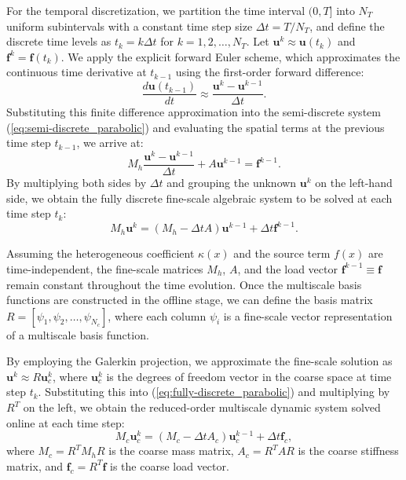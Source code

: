 For the temporal discretization, we partition the time interval $(0,T]$ into $N_T$ uniform subintervals with a constant time step size $\Delta t = T/N_T$, and define the discrete time levels as $t_k = k\Delta t$ for $k=1, 2, \dots, N_T$. Let $\mathbf{u}^k \approx \mathbf{u}(t_k)$ and $\mathbf{f}^k = \mathbf{f}(t_k)$. We apply the explicit forward Euler scheme, which approximates the continuous time derivative at $t_{k-1}$ using the first-order forward difference:
\begin{equation*}
\frac{d\mathbf{u}(t_{k-1})}{dt} \approx \frac{\mathbf{u}^k - \mathbf{u}^{k-1}}{\Delta t}.
\end{equation*}
Substituting this finite difference approximation into the semi-discrete system (\ref{eq:semi-discrete_parabolic}) and evaluating the spatial terms at the previous time step $t_{k-1}$, we arrive at:
\begin{equation*}
M_h \frac{\mathbf{u}^k - \mathbf{u}^{k-1}}{\Delta t} + A \mathbf{u}^{k-1} = \mathbf{f}^{k-1}.
\end{equation*}
By multiplying both sides by $\Delta t$ and grouping the unknown $\mathbf{u}^k$ on the left-hand side, we obtain the fully discrete fine-scale algebraic system to be solved at each time step $t_k$:
\begin{equation}
\label{eq:fully-discrete_parabolic}
M_h \mathbf{u}^k = \left( M_h - \Delta t A \right) \mathbf{u}^{k-1} + \Delta t \mathbf{f}^{k-1}.
\end{equation}

Assuming the heterogeneous coefficient $\kappa(x)$ and the source term $f(x)$ are time-independent, the fine-scale matrices $M_h$, $A$, and the load vector $\mathbf{f}^{k-1} \equiv \mathbf{f}$ remain constant throughout the time evolution. Once the multiscale basis functions are constructed in the offline stage, we can define the basis matrix $R = [\psi_1, \psi_2, \dots, \psi_{N_c}]$, where each column $\psi_i$ is a fine-scale vector representation of a multiscale basis function. 

By employing the Galerkin projection, we approximate the fine-scale solution as $\mathbf{u}^k \approx R \mathbf{u}_c^k$, where $\mathbf{u}_c^k$ is the degrees of freedom vector in the coarse space at time step $t_k$. Substituting this into (\ref{eq:fully-discrete_parabolic}) and multiplying by $R^T$ on the left, we obtain the reduced-order multiscale dynamic system solved online at each time step:
\begin{equation}
\label{eq:cem-discrete_parabolic}
M_c \mathbf{u}_c^k = \left( M_c - \Delta t A_c \right) \mathbf{u}_c^{k-1} + \Delta t \mathbf{f}_c,
\end{equation}
where $M_c = R^T M_h R$ is the coarse mass matrix, $A_c = R^T A R$ is the coarse stiffness matrix, and $\mathbf{f}_c = R^T \mathbf{f}$ is the coarse load vector. 